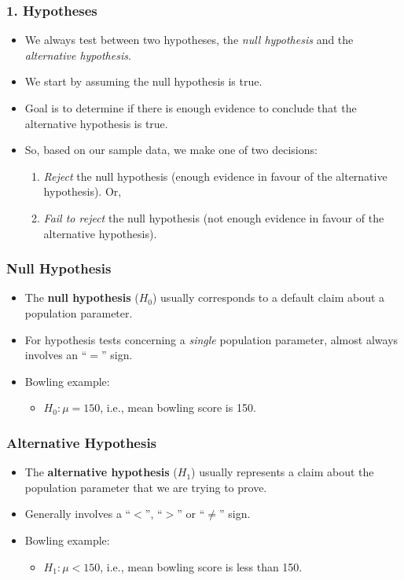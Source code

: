 \documentclass[12pt]{beamer}
\begin{document}
\begin{frame}
	\frametitle{\color{blue}1. Hypotheses}
	
	\begin{itemize}[label={\color{blue}$\blacktriangleright$}]
		\item We always test between two hypotheses, the \emph{null hypothesis} and the \emph{alternative hypothesis}.
		\item We start by assuming the null hypothesis is true.
		\item Goal is to determine if there is enough evidence to conclude that the alternative hypothesis is true.
		\item So, based on our sample data, we make one of two decisions:
		\begin{enumerate}[label=\textcolor{blue}{(\alph*)}]
			\item \emph{Reject} the null hypothesis (enough evidence in favour of the alternative hypothesis). Or,
			\item \emph{Fail to reject} the null hypothesis (not enough evidence in favour of the alternative hypothesis).
		\end{enumerate}
	\end{itemize}
	
\end{frame}
\begin{frame}
	\frametitle{\color{blue}Null Hypothesis}
	
	\begin{itemize}[label={\color{blue}$\blacktriangleright$}]
		\item The \textbf{null hypothesis} ($H_0$) usually corresponds to a default claim about a population parameter.
		\item For hypothesis tests concerning a \emph{single} population parameter, almost always involves an ``$=$'' sign.
		\item Bowling example:
		\begin{itemize}[label={\color{blue}$\blacktriangleright$}]
			\item $H_0 : \mu = 150$, i.e., mean bowling score is 150.
		\end{itemize}
	\end{itemize}
	
\end{frame}

\begin{frame}
	\frametitle{\color{blue}Alternative Hypothesis}
	
	\begin{itemize}[label={\color{blue}$\blacktriangleright$}]
		\item The \textbf{alternative hypothesis} ($H_1$) usually represents a claim about the population parameter that we are trying to prove.
		\item Generally involves a ``$<$'', ``$>$'' or ``$\neq$'' sign.
		\item Bowling example:
		\begin{itemize}
			\item $H_1 : \mu < 150$, i.e., mean bowling score is less than 150.
		\end{itemize}
	\end{itemize}
	
\end{frame}
\end{document}
